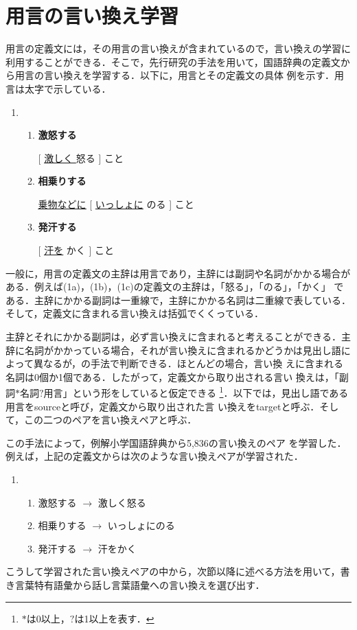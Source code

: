\documentclass{nlp}
\begin{document}
\section{用言の言い換え学習}
\label{sec:learn}
用言の定義文には，その用言の言い換えが含まれているので，言い換えの学習に
利用することができる．そこで，先行研究の手法を用いて，国語辞典の定義文か
ら用言の言い換えを学習する\cite{Kaji02}．以下に，用言とその定義文の具体
例を示す．用言は太字で示している．
\vspace{10pt}
\begin{enumerate}
 \item
      \begin{enumerate}
       \item {\bf 激怒する}

	     [ \underline{激しく }怒る ] こと
       \item {\bf 相乗りする}

	     \underline{\underline{乗物などに}} [ \underline{いっしょに} のる ] こと
       \item {\bf 発汗する}

	     [ \underline{\underline{汗を}} かく ] こと
      \end{enumerate}
\end{enumerate}
\addtocounter{exnum}{1}
\vspace{10pt}
一般に，用言の定義文の主辞は用言であり，主辞には副詞や名詞がかかる場合が
ある．例えば(1a)，(1b)，(1c)の定義文の主辞は，「怒る」，「のる」，「かく」
である．主辞にかかる副詞は一重線で，主辞にかかる名詞は二重線で表している．
そして，定義文に含まれる言い換えは括弧でくくっている．

主辞とそれにかかる副詞は，必ず言い換えに含まれると考えることができる．主
辞に名詞がかかっている場合，それが言い換えに含まれるかどうかは見出し語に
よって異なるが，\cite{Kaji02}の手法で判断できる．ほとんどの場合，言い換
えに含まれる名詞は0個か1個である．したがって，定義文から取り出される言い
換えは，「副詞$*$名詞$?$用言」という形をしていると仮定できる
\footnote{
$*$は0以上，$?$は1以上を表す．
}．以下では，見出し語である用言をsourceと呼び，定義文から取り出された言
い換えをtargetと呼ぶ．そして，この二つのペアを言い換えペアと呼ぶ．

この手法によって，例解小学国語辞典\cite{RSK97}から5,836の言い換えのペア
を学習した．例えば，上記の定義文からは次のような言い換えペアが学習された．
\vspace{10pt}
\begin{enumerate}
 \item
      \begin{enumerate}
       \item 激怒する $\rightarrow$ 激しく怒る
       \item 相乗りする $\rightarrow$ いっしょにのる
       \item 発汗する $\rightarrow$ 汗をかく
      \end{enumerate}
\end{enumerate}
\vspace{10pt}
\addtocounter{exnum}{1}
こうして学習された言い換えペアの中から，次節以降に述べる方法を用いて，書
き言葉特有語彙から話し言葉語彙への言い換えを選び出す．
\end{document}
